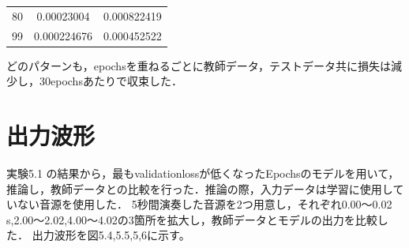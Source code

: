 \documentclass{jreport}		%
\begin{document}
\begin{table}
\begin{center}
\begin{tabular}{c|cc}
80&0.00023004&0.000822419 \\
99&0.000224676&0.000452522 \\ \hline
  \end{tabular}
  \end{center}
\end{table}

どのパターンも，epochsを重ねるごとに教師データ，テストデータ共に損失は減少し，30epochsあたりで収束した．

\clearpage
\section{出力波形}
実験5.1 の結果から，最もvalidationlossが低くなったEpochsのモデルを用いて，推論し，教師データとの比較を行った．推論の際，入力データは学習に使用していない音源を使用した．
5秒間演奏した音源を2つ用意し，それぞれ0.00～0.02 s,2.00～2.02,4.00～4.02の3箇所を拡大し，教師データとモデルの出力を比較した．
出力波形を図5.4,5.5,5,6に示す。
\end{document}
